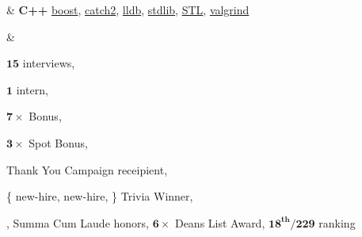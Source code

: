 \documentclass[11pt,a4paper]{article}  %
\begin{document}
\begin{ressection}
    & \textbf{C++}
        \href{}{boost},
        \href{https://github.com/catchorg/Catch2}{catch2},
        \href{https://lldb.llvm.org/}{lldb},
        \href{}{stdlib},
        \href{}{STL},
        \href{https://www.valgrind.org/}{valgrind}

\end{ressection}
%
\begin{ressection}
     &

    $\bm{15}$ interviews,

    $\bm{1}$ intern,

    $\bm{7\times}$  Bonus,

    $\bm{3\times}$  Spot Bonus,

     Thank You Campaign receipient,

    \{ new-hire,  new-hire, \} Trivia Winner,

     ,
    Summa Cum Laude honors, %
    $\bm{6\times}$ Deans List Award, %
    $\bm{18^\text{th}/229}$  ranking

\end{ressection}


\vspace{-.5em}
\end{document}
